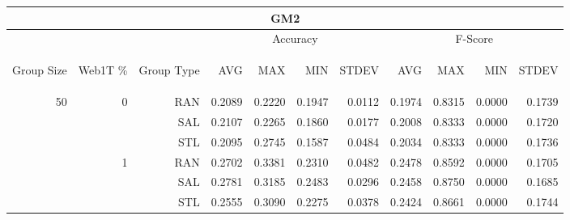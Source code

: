 \begin{center}
\begin{table}[htbp]
\begin{tabular}{ | r | r | r | r | r | r | r | r | r | r | r |}
\hline
\multicolumn{11}{|c|}{GM2}\\
\hline
 & & & \multicolumn{4}{|c|}{Accuracy} & \multicolumn{4}{|c|}{F-Score}\\ \cline{4-11}
\begin{sideways}Group Size\end{sideways} & \begin{sideways}Web1T \%\end{sideways} & \begin{sideways}Group Type\end{sideways} & \begin{sideways}AVG\end{sideways} & \begin{sideways}MAX\end{sideways} & \begin{sideways}MIN\end{sideways} & \begin{sideways}STDEV\end{sideways} & \begin{sideways}AVG\end{sideways} & \begin{sideways}MAX\end{sideways} & \begin{sideways}MIN\end{sideways} & \begin{sideways}STDEV\end{sideways}\\
\hline
\multirow{15}{*}{50}
 & \multirow{3}{*}{0} & RAN & 0.2089 & 0.2220 & 0.1947 & 0.0112 & 0.1974 & 0.8315 & 0.0000 & 0.1739\\ \cline{3-11}
 &   & SAL & 0.2107 & 0.2265 & 0.1860 & 0.0177 & 0.2008 & 0.8333 & 0.0000 & 0.1720\\ \cline{3-11}
 &   & STL & 0.2095 & 0.2745 & 0.1587 & 0.0484 & 0.2034 & 0.8333 & 0.0000 & 0.1736\\ \cline{2-11}
 & \multirow{3}{*}{1} & RAN & 0.2702 & 0.3381 & 0.2310 & 0.0482 & 0.2478 & 0.8592 & 0.0000 & 0.1705\\ \cline{3-11}
 &   & SAL & 0.2781 & 0.3185 & 0.2483 & 0.0296 & 0.2458 & 0.8750 & 0.0000 & 0.1685\\ \cline{3-11}
 &   & STL & 0.2555 & 0.3090 & 0.2275 & 0.0378 & 0.2424 & 0.8661 & 0.0000 & 0.1744\\ \cline{2-11}

\end{tabular}
\end{table}
\end{center}
